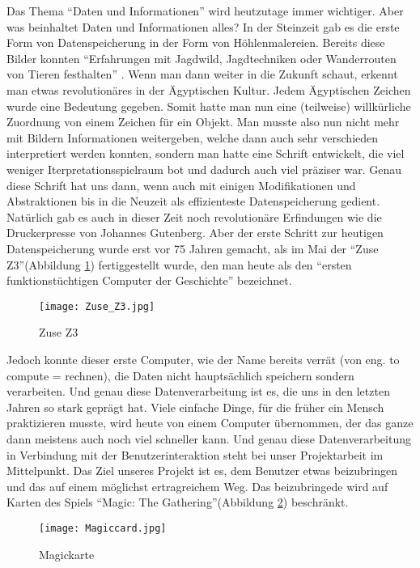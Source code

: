 Das Thema "`Daten und Informationen"' wird heutzutage immer wichtiger. Aber was beinhaltet Daten und Informationen alles? In der Steinzeit gab es die erste Form von Datenspeicherung in der Form von Höhlenmalereien. Bereits diese Bilder konnten "`Erfahrungen  mit Jagdwild, Jagdtechniken oder Wanderrouten von Tieren festhalten"' \cite{Hoehlenmalerei}. Wenn man dann weiter in die Zukunft schaut, erkennt man etwas revolutionäres in der Ägyptischen Kultur. Jedem Ägyptischen Zeichen wurde eine Bedeutung gegeben. Somit hatte man nun eine (teilweise) willkürliche Zuordnung von einem Zeichen für ein Objekt. Man musste also nun nicht mehr mit Bildern Informationen weitergeben, welche dann auch sehr verschieden interpretiert werden konnten, sondern man hatte eine Schrift entwickelt, die viel weniger Iterpretationsspielraum bot und dadurch auch viel präziser war. Genau diese Schrift hat uns dann, wenn auch mit einigen Modifikationen und Abstraktionen bis in die Neuzeit als effizienteste Datenspeicherung gedient. Natürlich gab es auch in dieser Zeit noch revolutionäre Erfindungen wie die Druckerpresse von Johannes Gutenberg. Aber der erste Schritt zur heutigen Datenspeicherung wurde erst vor 75 Jahren gemacht, als im Mai der "`Zuse Z3"'(Abbildung \ref{fig:Zuse_Z3}) fertiggestellt wurde, den man heute als den "`ersten funktionstüchtigen Computer der Geschichte"' bezeichnet. \cite{Computer} 
\begin{figure}[htbp] 
  \centering
     \texttt{[image: Zuse\_Z3.jpg]}
  \caption{Zuse Z3 \cite{Zuse_Z3}}
  \label{fig:Zuse_Z3}
\end{figure}
Jedoch konnte dieser erste Computer, wie der Name bereits verrät (von eng. to compute = rechnen), die Daten nicht hauptsächlich speichern sondern verarbeiten. Und genau diese Datenverarbeitung ist es, die uns in den letzten Jahren so stark geprägt hat. Viele einfache Dinge, für die früher ein Mensch praktizieren musste, wird heute von einem Computer übernommen, der das ganze dann meistens auch noch viel schneller kann. Und genau diese Datenverarbeitung in Verbindung mit der Benutzerinteraktion steht bei unser Projektarbeit im Mittelpunkt. Das Ziel unseres Projekt ist es, dem Benutzer etwas beizubringen und das auf einem möglichst ertragreichem Weg. Das beizubringede wird auf Karten des Spiels "`Magic: The Gathering"'(Abbildung \ref{fig:Magiccard}) beschränkt.
\begin{figure}[htbp] 
  \centering
     \texttt{[image: Magiccard.jpg]}
  \caption{Magickarte \cite{Magiccard}}
  \label{fig:Magiccard}
\end{figure}
